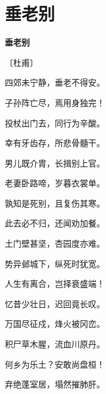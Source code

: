 \documentclass[12pt,UTF-8,openany,fontset=none]{ctexbook}
\begin{document}
\vspace{8pt}
\clearpage

\section{垂老别}


\begin{center}
    {\bfseries 垂老别}

    \vspace{18pt}

    \begin{large}\xuwen
        〔杜甫〕
    \end{large}

\end{center}

    \vspace{18pt}  %

\begin{center}
    \begin{Large}

        四郊未宁静，垂老不得安。

        子孙阵亡尽，焉用身独完！

        投杖出门去，同行为辛酸。

        幸有牙齿存，所悲骨髓干。

        男儿既介胄，长揖别上官。

        老妻卧路啼，岁暮衣裳单。

        孰知是死别，且复伤其寒。

        此去必不归，还闻劝加餐。

        土门壁甚坚，杏园度亦难。

        势异邺城下，纵死时犹宽。

        人生有离合，岂择衰盛端！

        忆昔少壮日，迟回竟长叹。

        万国尽征戍，烽火被冈峦。

        积尸草木腥，流血川原丹。

        何乡为乐土？安敢尚盘桓！

        弃绝蓬室居，塌然摧肺肝。

    \end{Large}

\end{center}

\vspace{8pt}
\clearpage
\end{document}
